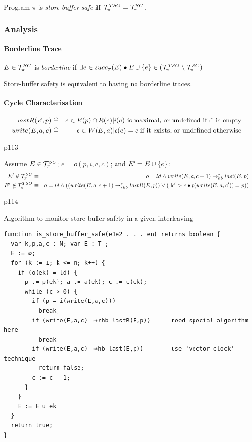 Program $\pi$ is \emph{store-buffer safe}
iff $\mathcal{T}_\pi^{TSO} = \mathcal{T}_\pi^{SC}$.


\subsubsection{Analysis}

\paragraph{Borderline Trace}

$E \in \mathcal{T}_\pi^{SC}$ is \emph{borderline}
if $\exists e \in succ_\pi(E)
   \bullet
   E \cup \{{e}\} \in (\mathcal{T}_\pi^{TSO} \setminus \mathcal{T}_\pi^{SC})$

Store-buffer safety is equivalent to having no borderline traces.

\paragraph{Cycle Characterisation}

\begin{eqnarray*}
   lastR(E,p)
   &\mathrel{\widehat=}&
   e \in E(p) \cap R(e) |
       i(e) \mbox{ is maximal, or undefined if $\cap$ is empty}
\\ write(E,a,c)
   &\mathrel{\widehat=}&
   e \in W(E,a) |
       c(e)=c \mbox{ if it exists, or undefined otherwise}
\end{eqnarray*}

p113:

Assume
  $E \in \mathcal{T}_\pi^{SC}$;
  $e = o(p,i,a,c)$;
  and
  $E' = E \cup \{{e}\}$:
\begin{eqnarray*}
   E' \notin \mathcal{T}_\pi^{SC}
   &\equiv&
   o = ld \land write(E,a,c+1) \rightarrow_{hb}^* last(E,p)
\\ E' \notin \mathcal{T}_\pi^{TSO}
   &\equiv&
   o = ld
   \land
   ( (write(E,a,c+1) \rightarrow_{rhb}^* lastR(E,p))
     \lor
     (\exists c' > c \bullet p(write(E,a,c'))=p))
\end{eqnarray*}

\newpage

p114:

Algorithm to monitor store buffer safety in a given interleaving:
\begin{verbatim}
function is_store_buffer_safe(e1e2 . . . en) returns boolean {
  var k,p,a,c : N; var E : T ;
  E := ∅;
  for (k := 1; k <= n; k++) {
    if (o(ek) = ld) {
      p := p(ek); a := a(ek); c := c(ek);
      while (c > 0) {
        if (p = i(write(E,a,c)))
          break;
        if (write(E,a,c) →∗rhb lastR(E,p))   -- need special algorithm here
          break;
        if (write(E,a,c) →∗hb last(E,p))     -- use 'vector clock' technique
          return false;
        c := c - 1;
      }
    }
    E := E ∪ ek;
  }
  return true;
}
\end{verbatim}

